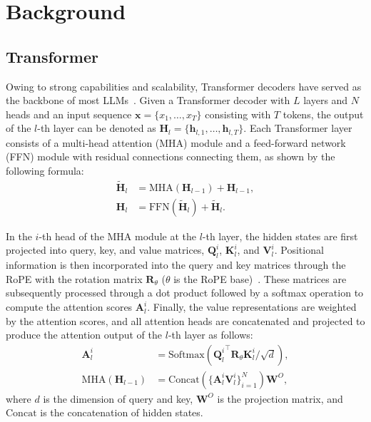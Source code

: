 \section{Background}
\label{sec:background}

\subsection{Transformer}
Owing to strong capabilities and scalability, Transformer decoders have served as the backbone of most LLMs~\cite{vaswani-nips-2017-attention, Touvron-arxiv-2023-llama2,Dubey-arxiv-2023-llama3}. Given a Transformer decoder with $L$ layers and $N$ heads and an input sequence $\bm{x} = \{ x_1, \dots, x_T \}$ consisting with $T$ tokens, the output of the $l$-th layer can be denoted as $\mathbf{H}_l = \{\bm{h}_{l,1}, \dots, \bm{h}_{l,T}\}$. Each Transformer layer consists of a multi-head attention (MHA) module and a feed-forward network (FFN) module with residual connections connecting them, as shown by the following formula:
\begin{align}
    \widetilde {\mathbf H}_l &= \mathrm{MHA}(\mathbf H_{l-1})+\mathbf H_{l-1},\\\mathbf H_l &= \mathrm{FFN}(\widetilde {\mathbf H}_l) + \widetilde {\mathbf H}_l.
\end{align}

In the $i$-th head of the MHA module at the $l$-th layer, the hidden states are first projected into query, key, and value matrices, \ie $\mathbf{Q}_l^{i}$, $\mathbf{K}_l^{i}$, and $\mathbf{V}_l^{i}$. Positional information is then incorporated into the query and key matrices through the RoPE with the rotation matrix $\mathbf{R}_{\theta}$ ($\theta$ is the RoPE base)~\cite{su-neurocomputing-2024-roformer}. These matrices are subsequently processed through a dot product followed by a softmax operation to compute the attention scores $\mathbf{A}_l^{i}$. Finally, the value representations are weighted by the attention scores, and all attention heads are concatenated and projected to produce the attention output of the $l$-th layer as follows:
\begin{align}
    \mathbf A_l^{i} &= \mathrm{Softmax}({\mathbf Q_{l}^{i}}^\intercal \mathbf R_{\theta} {\mathbf K_{l}^{i}}/\sqrt d ),\\
    \mathrm{MHA}(\mathbf H_{l-1}) &= \mathrm{Concat}(\{\mathbf A_l^{i} \mathbf V_l^{i}\}_{i=1}^N)\mathbf W^O,
\end{align}
where $d$ is the dimension of query and key, $\mathbf W^O$ is the projection matrix, and $\mathrm{Concat}$ is the concatenation of hidden states.

